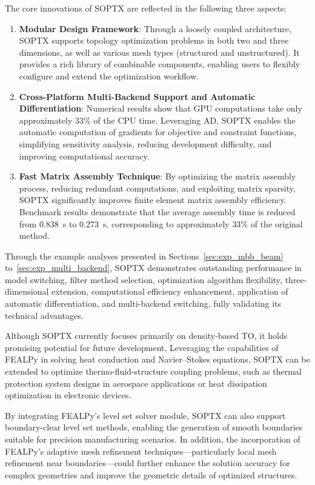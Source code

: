 \documentclass[mathpazo]{cicp}
\begin{document}
The core innovations of SOPTX are reflected in the following three aspects:
\begin{enumerate} 
	\item \textbf{Modular Design Framework}: Through a loosely coupled architecture, SOPTX supports topology optimization problems in both two and three dimensions, as well as various mesh types (structured and unstructured). It provides a rich library of combinable components, enabling users to flexibly configure and extend the optimization workflow.
	\item \textbf{Cross-Platform Multi-Backend Support and Automatic Differentiation}: Numerical results show that GPU computations take only approximately $33\%$ of the CPU time. Leveraging AD, SOPTX enables the automatic computation of gradients for objective and constraint functions, simplifying sensitivity analysis, reducing development difficulty, and improving computational accuracy.
	\item \textbf{Fast Matrix Assembly Technique}: By optimizing the matrix assembly process, reducing redundant computations, and exploiting matrix sparsity, SOPTX significantly improves finite element matrix assembly efficiency. Benchmark results demonstrate that the average assembly time is reduced from \SI{0.838}{s} to \SI{0.273}{s}, corresponding to approximately $33\%$ of the original method.
\end{enumerate}

Through the example analyses presented in Sections~\ref{sec:exp_mbb_beam} to~\ref{sec:exp_multi_backend}, SOPTX demonstrates outstanding performance in model switching, filter method selection, optimization algorithm flexibility, three-dimensional extension, computational efficiency enhancement, application of automatic differentiation, and multi-backend switching, fully validating its technical advantages.

Although SOPTX currently focuses primarily on density-based TO, it holds promising potential for future development. Leveraging the capabilities of FEALPy in solving heat conduction and Navier–Stokes equations, SOPTX can be extended to optimize thermo-fluid-structure coupling problems, such as thermal protection system designs in aerospace applications or heat dissipation optimization in electronic devices. 

By integrating FEALPy's level set solver module, SOPTX can also support boundary-clear level set methods, enabling the generation of smooth boundaries suitable for precision manufacturing scenarios. In addition, the incorporation of FEALPy's adaptive mesh refinement techniques—particularly local mesh refinement near boundaries---could further enhance the solution accuracy for complex geometries and improve the geometric details of optimized structures. 
\end{document}
